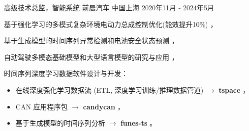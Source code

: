 \documentclass[../cv_cn.tex]{subfiles}
\begin{document}


\begin{cventries}

  \cventry
    {高级技术总监，智能系统} %
    {前晨汽车} %
    {中国上海} %
    {2020年11月 - 2024年5月} %
    {
      \begin{cvitems} %
          \item 基于强化学习的多模式复杂环境电动力总成控制优化(能效提升10\%) \supercite{Xin_VEOS_22} \supercite{Xin_Fu_Pan_Simulation_Test_RL_22} \supercite{Pan_Xin_DrvStyle_23}，
          \item 基于生成模型的时间序列异常检测和电池安全状态预测 \supercite{Xin_GenAI_23} \supercite{Xin_Chen_NN_TSFeatures_23}，
          \item 自动驾驶多模态基础模型和大型语言模型的研究与应用 \supercite{Xin_LLM_24} \supercite{Xin_VLM_24} \supercite{Xin_Latent_Diffusion_23}，
          \item 时间序列深度学习数据软件设计与开发：
            \begin{itemize}
                    \item 在线深度强化学习数据流 (ETL, 深度学习训练/推理数据管道) $\rightarrow$ \textbf{tspace} \href{https://binjian.github.io/tspace/}{\faGithub}，
                    \item CAN 应用程序包 $\rightarrow$ \textbf{candycan} \href{https://binjian.github.io/candycan/}{\faGithub}，
                    \item 基于生成模型的时间序列分析 $\rightarrow$ \textbf{funes-ts} \href{https://github.com/binjian/funes-ts/}{\faGithub}。
            \end{itemize}
      \end{cvitems}
    }


\end{cventries}
\end{document}
